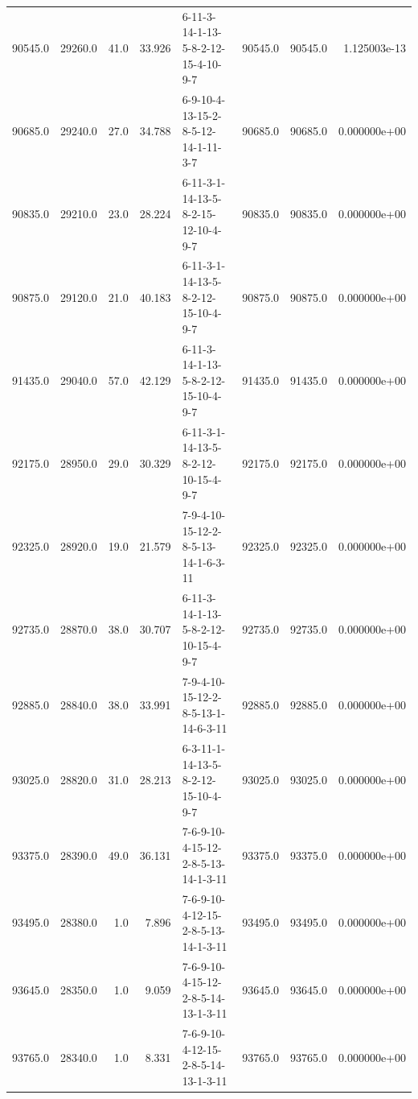 \begin{tabular}{rrrrlrrr}
  90545.0 &  29260.0 &           41.0 &             33.926 &  6-11-3-14-1-13-5-8-2-12-15-4-10-9-7 &       90545.0 &         90545.0 &  1.125003e-13 \\
  90685.0 &  29240.0 &           27.0 &             34.788 &  6-9-10-4-13-15-2-8-5-12-14-1-11-3-7 &       90685.0 &         90685.0 &  0.000000e+00 \\
  90835.0 &  29210.0 &           23.0 &             28.224 &  6-11-3-1-14-13-5-8-2-15-12-10-4-9-7 &       90835.0 &         90835.0 &  0.000000e+00 \\
  90875.0 &  29120.0 &           21.0 &             40.183 &  6-11-3-1-14-13-5-8-2-12-15-10-4-9-7 &       90875.0 &         90875.0 &  0.000000e+00 \\
  91435.0 &  29040.0 &           57.0 &             42.129 &  6-11-3-14-1-13-5-8-2-12-15-10-4-9-7 &       91435.0 &         91435.0 &  0.000000e+00 \\
  92175.0 &  28950.0 &           29.0 &             30.329 &  6-11-3-1-14-13-5-8-2-12-10-15-4-9-7 &       92175.0 &         92175.0 &  0.000000e+00 \\
  92325.0 &  28920.0 &           19.0 &             21.579 &  7-9-4-10-15-12-2-8-5-13-14-1-6-3-11 &       92325.0 &         92325.0 &  0.000000e+00 \\
  92735.0 &  28870.0 &           38.0 &             30.707 &  6-11-3-14-1-13-5-8-2-12-10-15-4-9-7 &       92735.0 &         92735.0 &  0.000000e+00 \\
  92885.0 &  28840.0 &           38.0 &             33.991 &  7-9-4-10-15-12-2-8-5-13-1-14-6-3-11 &       92885.0 &         92885.0 &  0.000000e+00 \\
  93025.0 &  28820.0 &           31.0 &             28.213 &  6-3-11-1-14-13-5-8-2-12-15-10-4-9-7 &       93025.0 &         93025.0 &  0.000000e+00 \\
  93375.0 &  28390.0 &           49.0 &             36.131 &  7-6-9-10-4-15-12-2-8-5-13-14-1-3-11 &       93375.0 &         93375.0 &  0.000000e+00 \\
  93495.0 &  28380.0 &            1.0 &              7.896 &  7-6-9-10-4-12-15-2-8-5-13-14-1-3-11 &       93495.0 &         93495.0 &  0.000000e+00 \\
  93645.0 &  28350.0 &            1.0 &              9.059 &  7-6-9-10-4-15-12-2-8-5-14-13-1-3-11 &       93645.0 &         93645.0 &  0.000000e+00 \\
  93765.0 &  28340.0 &            1.0 &              8.331 &  7-6-9-10-4-12-15-2-8-5-14-13-1-3-11 &       93765.0 &         93765.0 &  0.000000e+00 \\

\end{tabular}
